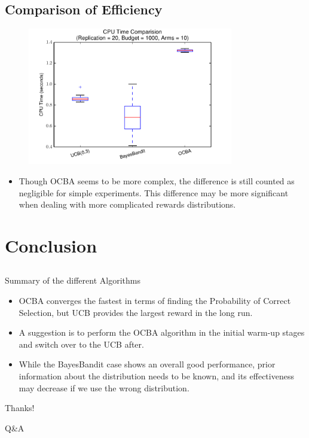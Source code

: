 \documentclass[compress]{beamer}
\begin{document}
\subsection{Comparison of Efficiency}
\begin{frame}
\begin{figure}[p]
    \centering
    \includegraphics[page=1,width=0.8\textwidth]{12boxplot_cpu_time.pdf}
\end{figure}
\begin{itemize}
\item Though OCBA seems to be more complex, the difference is still counted as negligible for simple experiments. This difference may be more significant when dealing with more complicated rewards distributions.
\end{itemize}
\end{frame}

\section{Conclusion}

\subsection{}

\begin{frame}
Summary of the different Algorithms
\begin{itemize}
\item OCBA converges the fastest in terms of finding the Probability of Correct Selection, but UCB provides the largest reward in the long run. 
\item A suggestion is to perform the OCBA algorithm in the initial warm-up stages and switch over to the UCB after.
\item While the BayesBandit case shows an overall good performance, prior information about the distribution needs to be known, and its effectiveness may decrease if we use the wrong distribution.
\end{itemize}
\end{frame}

\begin{frame}
\Huge{\centerline{Thanks!}}
\centerline{Q\&A}
\end{frame}
\end{document}
